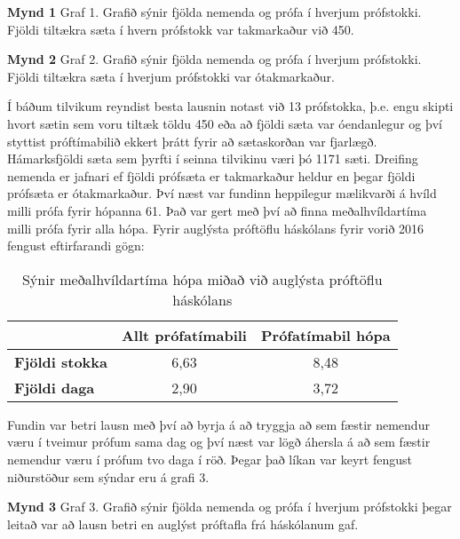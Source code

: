 \documentclass[12pt]{article}
\begin{document}
\bigskip

\textbf{Mynd 1}
Graf 1. Grafið sýnir fjölda nemenda og prófa í hverjum prófstokki. Fjöldi tiltækra sæta í hvern prófstokk var takmarkaður við 450.


\bigskip

\textbf{Mynd 2}
Graf 2. Grafið sýnir fjölda nemenda og prófa í hverjum prófstokki. Fjöldi tiltækra sæta í hverjum prófstokki var ótakmarkaður.

\bigskip
Í báðum tilvikum reyndist besta lausnin notast við 13 prófstokka, þ.e. engu skipti hvort sætin sem voru tiltæk töldu 450 eða að fjöldi sæta var óendanlegur og því styttist próftímabilið ekkert þrátt fyrir að sætaskorðan var fjarlægð. Hámarksfjöldi sæta sem þyrfti í seinna tilvikinu væri þó 1171 sæti. Dreifing nemenda er jafnari ef fjöldi prófsæta er takmarkaður heldur en þegar fjöldi prófsæta er ótakmarkaður. 
Því næst var fundinn heppilegur mælikvarði á hvíld milli prófa fyrir hópanna 61. Það var gert með því að finna meðalhvíldartíma milli prófa fyrir alla hópa. Fyrir auglýsta próftöflu háskólans fyrir vorið 2016 fengust eftirfarandi gögn: 

\bigskip

\begin{table}[h]
	\centering
	\label{my-label}
	\begin{tabular}{l|c|c|}
		\cline{2-3}
		& \multicolumn{1}{l|}{\textbf{Allt prófatímabili}} & \multicolumn{1}{l|}{\textbf{Prófatímabil hópa}} \\ \hline
		\multicolumn{1}{|l|}{\textbf{Fjöldi stokka}} & 6,63                                             & 8,48                                            \\ \hline
		\multicolumn{1}{|l|}{\textbf{Fjöldi daga}}   & 2,90                                             & 3,72                                            \\ \hline
	\end{tabular}
	\caption{Sýnir meðalhvíldartíma hópa miðað við auglýsta próftöflu háskólans}
\end{table}

Fundin var betri lausn með því að byrja á að tryggja að sem fæstir nemendur væru í tveimur prófum sama dag og því næst var lögð áhersla á að sem fæstir nemendur væru í prófum tvo daga í röð. Þegar það líkan var keyrt fengust niðurstöður sem sýndar eru á grafi 3.

\bigskip

\textbf{Mynd 3}
Graf 3. Grafið sýnir fjölda nemenda og prófa í hverjum prófstokki þegar leitað var að lausn betri en auglýst próftafla frá háskólanum gaf.
\end{document}
